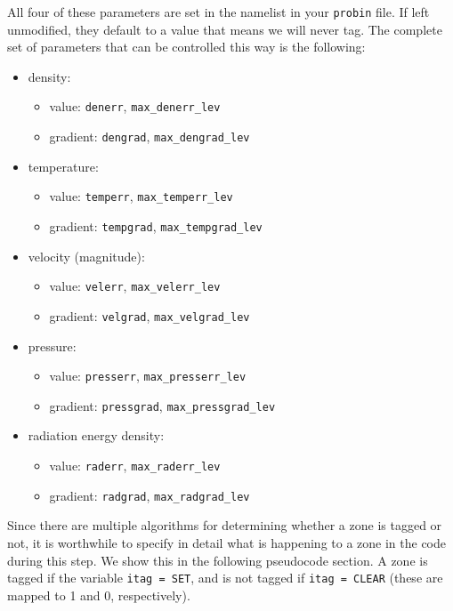 All four of these parameters are set in the  namelist
in your {\tt probin} file. If left unmodified, they
default to a value that means we will never tag. The complete set of
parameters that can be controlled this way is the following:
\begin{itemize}
\item density:
  \begin{itemize}
  \item value: {\tt denerr}, {\tt max\_denerr\_lev}
  \item gradient: {\tt dengrad}, {\tt max\_dengrad\_lev}
  \end{itemize}
\item temperature:
  \begin{itemize}
  \item value: {\tt temperr}, {\tt max\_temperr\_lev}
  \item gradient: {\tt tempgrad}, {\tt max\_tempgrad\_lev}
  \end{itemize}
\item velocity (magnitude):
  \begin{itemize}
  \item value: {\tt velerr}, {\tt max\_velerr\_lev}
  \item gradient: {\tt velgrad}, {\tt max\_velgrad\_lev}
  \end{itemize}
\item pressure:
  \begin{itemize}
  \item value: {\tt presserr}, {\tt max\_presserr\_lev}
  \item gradient: {\tt pressgrad}, {\tt max\_pressgrad\_lev}
  \end{itemize}
\item radiation energy density:
  \begin{itemize}
  \item value: {\tt raderr}, {\tt max\_raderr\_lev}
  \item gradient: {\tt radgrad}, {\tt max\_radgrad\_lev}
  \end{itemize}
\end{itemize}
Since there are multiple algorithms for determining 
whether a zone is tagged or not, it is worthwhile to specify 
in detail what is happening to a zone in the code during this step. 
We show this in the following pseudocode section. A zone 
is tagged if the variable {\tt itag = SET}, and is not tagged 
if {\tt itag = CLEAR} (these are mapped to 1 and 0, respectively).

